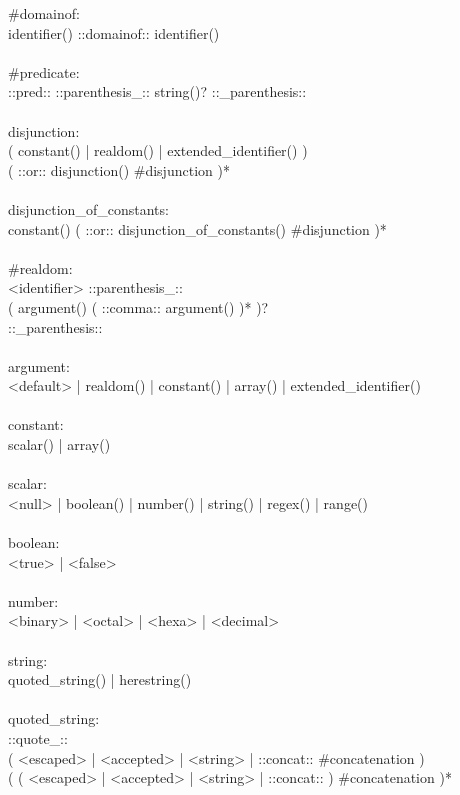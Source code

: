 \begin{bigbigpre}
#domainof: \\
    identifier() ::domainof:: identifier() \\
 \\
#predicate: \\
    ::pred:: ::parenthesis_:: string()? ::_parenthesis:: \\
 \\
disjunction: \\
    ( constant() | realdom() | extended_identifier() ) \\
    ( ::or:: disjunction() #disjunction )* \\
 \\
disjunction_of_constants: \\
    constant() ( ::or:: disjunction_of_constants() #disjunction )* \\
 \\
#realdom: \\
    <identifier> ::parenthesis_:: \\
    ( argument() ( ::comma:: argument() )* )? \\
    ::_parenthesis:: \\
 \\
argument: \\
    <default> | realdom() | constant() | array() | extended_identifier() \\
 \\
constant: \\
    scalar() | array() \\
 \\
scalar: \\
    <null> | boolean() | number() | string() | regex() | range() \\
 \\
boolean: \\
    <true> | <false> \\
 \\
number: \\
    <binary> | <octal> | <hexa> | <decimal> \\
 \\
string: \\
    quoted_string() | herestring() \\
 \\
quoted_string: \\
    ::quote_:: \\
    ( <escaped> | <accepted> | <string> | ::concat:: #concatenation ) \\
    ( ( <escaped> | <accepted> | <string> | ::concat:: ) #concatenation )* \\

\end{bigbigpre}
